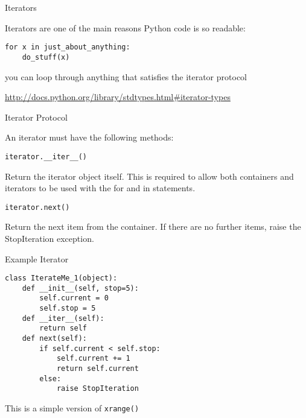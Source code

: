 \documentclass{beamer}
\begin{document}
\begin{frame}[fragile]{Iterators}

{\Large Iterators are one of the main reasons Python code is so readable:}

\begin{verbatim}
for x in just_about_anything:
    do_stuff(x)
\end{verbatim}

{\Large you can loop through anything that satisfies the iterator protocol}

\vfill
\url{http://docs.python.org/library/stdtypes.html#iterator-types}
\end{frame} 

\begin{frame}[fragile]{Iterator Protocol}

{\Large An iterator must have the following methods:}

\begin{verbatim}
iterator.__iter__()
\end{verbatim}

Return the iterator object itself. This is required to allow both containers
and iterators to be used with the for and in statements.

\begin{verbatim}
iterator.next()
\end{verbatim}

Return the next item from the container. If there are no further items,
raise the StopIteration exception.

\end{frame} 


\begin{frame}[fragile]{Example Iterator}

\begin{verbatim}
class IterateMe_1(object):
    def __init__(self, stop=5):
        self.current = 0
        self.stop = 5
    def __iter__(self):
        return self
    def next(self):
        if self.current < self.stop:
            self.current += 1
            return self.current
        else:
            raise StopIteration
\end{verbatim}

{\Large This is a simple version of \verb|xrange()|}

\end{frame} 
\end{document}
